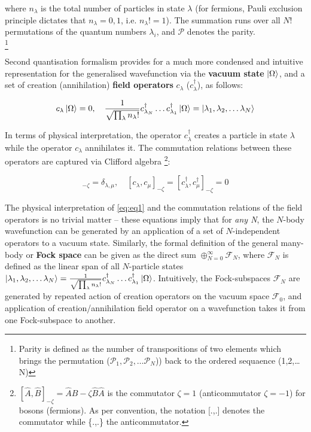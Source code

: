 where $n_{\lambda}$ is the total number of particles in state $\lambda$ (for fermions, Pauli exclusion principle dictates that $n_{\lambda} = 0,1$, i.e. $n_{\lambda}! = 1$). The summation runs over all $N!$ permutations of the quantum numbers $\lambda_{i}$, and $\mathcal{P}$ denotes the parity. \\ \footnote{Parity is defined as the number of transpositions of two elements which brings the permutation ($\mathcal{P}_1, \mathcal{P}_2,\ldots \mathcal{P}_{N}$)) back to the ordered sequaence (1,2,\ldots N)}

Second quantisation formalism provides for a much more condensed and intuitive representation for the generalised wavefunction via the \textbf{vacuum state} $\ket{\Omega}$, and a set of creation (annihilation) \textbf{field operators} $c_{\lambda}$ ($c_{\lambda}^{\dagger}$), as follows:

\begin{equation}
\label{eq:eq1}
    c_{\lambda} \ket{\Omega} = 0, \quad \frac{1}{\sqrt{\prod_{\lambda}n_{\lambda}!}} c_{\lambda_N}^{\dagger} \ldots c_{\lambda_1}^{\dagger} \ket{\Omega} = \ket{\lambda_{1}, \lambda_{2},\ldots \lambda_{N}}
\end{equation}

In terms of physical interpretation, the operator $c_{\lambda}^{\dagger}$ creates a particle in state $\lambda$ while the operator $c_{\lambda}$ annihilates it. The commutation relations between these operators are captured via Clifford algebra \footnote{$[\hat{A},\hat{B}]_{-\zeta} = \hat{A}\hat{B}-\zeta \hat{B}\hat{A}$ is the commutator $\zeta = 1$ (anticommutator $\zeta = -1$) for bosons (fermions). As per convention, the notation [.,.] denotes the commutator while \{.,.\} the anticommutator.}:

\begin{equation}
    [c_{\lambda},c_{\mu}^{\dagger}]_{-\zeta} = \delta_{\lambda,\mu}, \quad [c_{\lambda},c_{\mu}]_{-\zeta} = [c_{\lambda}^{\dagger},c_{\mu}^{\dagger}]_{-\zeta} = 0
\end{equation}

The physical interpretation of \ref{eq:eq1} and the commutation relations of the field operators is no trivial matter -- these equations imply that for \textit{any N}, the $N$-body wavefunction can be generated by an application of a set of $N$-independent operators to a vacuum state. Similarly, the formal definition of the general many-body or \textbf{Fock space} can be given as the direct sum $\oplus_{N=0}^{\infty}\mathcal{F}_N$, where $\mathcal{F}_N$ is defined as the linear span of all $N$-particle states $\ket{\lambda_{1}, \lambda_{2},\ldots \lambda_{N}} = \frac{1}{\sqrt{\prod_{\lambda}n_{\lambda}!}} c_{\lambda_N}^{\dagger} \ldots c_{\lambda_1}^{\dagger} \ket{\Omega}$. Intuitively, the Fock-subspaces $\mathcal{F}_N$ are generated by repeated action of creation operators on the vacuum space $\mathcal{F}_0$, and application of creation/annihilation field operator on a wavefunction takes it from one Fock-subspace to another. \\ 

